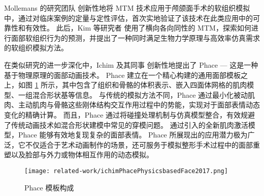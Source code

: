 Mollemans 的研究团队 \cite{mollemansPredictingSoftTissue2007} 创新性地将 MTM 技术应用于颅颌面手术的软组织模拟中，通过对临床案例的定量与定性评估，首次实地验证了该技术在此类应用中的可靠性和有效性。
此后，Kim 等研究者 \cite{kimNewSofttissueSimulation2010} 使用了横向各向同性的 MTM，探索如何进行面部软组织行为的预测，并提出了一种同时满足生物力学原理与高效率仿真需求的软组织模拟方法。

在类似研究的进一步深化中，Ichim 及其同事 \cite{ichimPhacePhysicsbasedFace2017} 创新性地提出了 Phace --- 这是一种基于物理原理的面部动画技术。
Phace 建立在一个精心构建的通用面部模板之上，如图 \ref{fig:ichimPhacePhysicsbasedFace2017} 所示，其中包含了组织和骨骼的体积表示、嵌入四面体网格的肌肉模型、一组混合形状基等信息。
与传统的模拟方法不同，Phace 通过最小化被动肌肉、主动肌肉与骨骼这些刚体结构交互作用过程中的势能，实现对于面部表情动态变化的精确计算。
而且，Phace 通过将碰撞处理机制与仿真模型整合，有效规避了传统动画技术如混合形状建模中常见的穿模问题。
通过引入的全新肌肉激活模型，Phace 能够有效地复现复杂的面部表情。
Phace 所展现出的应用潜力极为广泛，它不仅适合于艺术动画制作的场景，还可服务于模拟整形手术过程中的面部重塑以及脸部与外力或物体相互作用的动态模拟。

\begin{figure}
  \centering
  \texttt{[image: related-work/ichimPhacePhysicsbasedFace2017.png]}
  \caption{Phace 模板构成 \cite{ichimPhacePhysicsbasedFace2017}}
  \label{fig:ichimPhacePhysicsbasedFace2017}
\end{figure}
